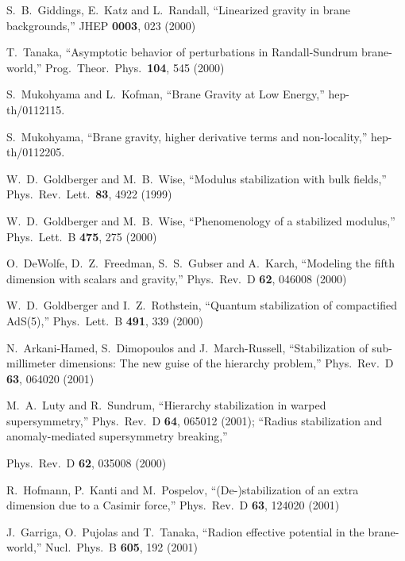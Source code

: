 \documentclass[a4paper,showpacs,preprintnumbers,amsmath,amssymb]{revtex4}
\begin{document}
\begin{thebibliography}{99}
S.~B.~Giddings, E.~Katz and L.~Randall,
 ``Linearized gravity in brane backgrounds,''
JHEP {\bf 0003}, 023 (2000)


T.~Tanaka,
 ``Asymptotic behavior of perturbations in Randall-Sundrum brane-world,''
Prog.\ Theor.\ Phys.\  {\bf 104}, 545 (2000)

 
S.~Mukohyama and L.~Kofman,
 ``Brane Gravity at Low Energy,''
 hep-th/0112115.
 
 
S.~Mukohyama,
 ``Brane gravity, higher derivative terms and non-locality,''
 hep-th/0112205.
  
 

 



W.~D.~Goldberger and M.~B.~Wise,
 ``Modulus stabilization with bulk fields,''
Phys.\ Rev.\ Lett.\  {\bf 83}, 4922 (1999)
 
 
W.~D.~Goldberger and M.~B.~Wise,
 ``Phenomenology of a stabilized modulus,''
Phys.\ Lett.\ B {\bf 475}, 275 (2000)
 
 
O.~DeWolfe, D.~Z.~Freedman, S.~S.~Gubser and A.~Karch,
 ``Modeling the fifth dimension with scalars and gravity,''
Phys.\ Rev.\ D {\bf 62}, 046008 (2000)

 
W.~D.~Goldberger and I.~Z.~Rothstein,
 ``Quantum stabilization of compactified AdS(5),''
Phys.\ Lett.\ B {\bf 491}, 339 (2000)


N.~Arkani-Hamed, S.~Dimopoulos and J.~March-Russell,
 ``Stabilization of sub-millimeter dimensions: The new guise of the  hierarchy problem,''
Phys.\ Rev.\ D {\bf 63}, 064020 (2001)


M.~A.~Luty and R.~Sundrum,
 ``Hierarchy stabilization in warped supersymmetry,''
Phys.\ Rev.\ D {\bf 64}, 065012 (2001);
 ``Radius stabilization and anomaly-mediated supersymmetry breaking,''

Phys.\ Rev.\ D {\bf 62}, 035008 (2000)

 
R.~Hofmann, P.~Kanti and M.~Pospelov,
 ``(De-)stabilization of an extra dimension due to a Casimir force,''
Phys.\ Rev.\ D {\bf 63}, 124020 (2001)

 
J.~Garriga, O.~Pujolas and T.~Tanaka,
 ``Radion effective potential in the brane-world,''
Nucl.\ Phys.\ B {\bf 605}, 192 (2001)



\end{thebibliography}
\end{document}

